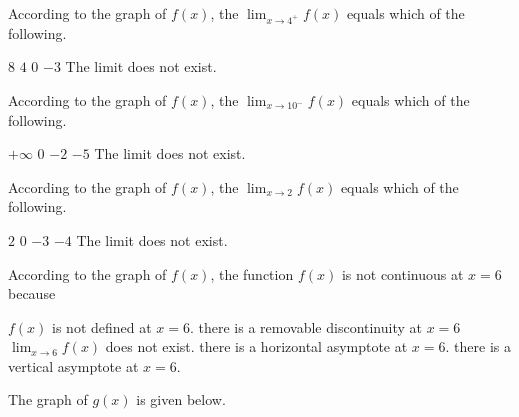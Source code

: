 \documentclass[11pt]{article}
\begin{document}
\begin{questions}
\begin{multiplechoice}{5}

\question According to the graph of $f(x)$, the $\lim_{x\to 4^+}f(x) $ equals which of the following.
\begin{answers}{3}
\ans $8$
\ans $4$
\ans $0$
\ans $-3$
\ans The limit does not exist.
\end{answers}



\question According to the graph of $f(x)$, the $\lim_{x\to 10^-}f(x) $ equals which of the following.
\begin{answers}{3}
\ans $+\infty$
\ans $0$
\ans $-2$
\ans $-5$
\ans The limit does not exist.
\end{answers}


\question According to the graph of $f(x)$, the $\lim_{x\to 2}f(x) $ equals which of the following.
\begin{answers}{3}
\ans $2$
\ans $0$
\ans $-3$
\ans $-4$
\ans The limit does not exist.
\end{answers}





\question According to the graph of $f(x)$, the function $f(x)$ is not continuous at $x=6$ because
\begin{answers}{3}
\ans $f(x)$ is not defined at $x=6$.
\ans there is a removable discontinuity at $x=6$
\ans $\lim_{x\to 6}f(x)$ does not exist.
\ans there is a horizontal asymptote at $x=6$. 
\ans there is a vertical asymptote at $x=6$.
\end{answers}



\nextpage

\question The graph of $g(x)$ is given below.\\


\end{multiplechoice}
\end{questions}
\end{document}
